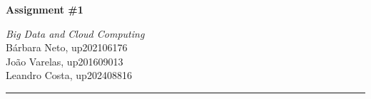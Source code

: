 \documentclass[a4paper,11pt]{article}
\renewenvironment{abstract}
 {\par\noindent\textbf{\abstractname}\ \ignorespaces \\}
 {\par\noindent\medskip}
\begin{document}
\pagestyle{fancy}
\thispagestyle{empty}
\renewcommand*{\thefootnote}{\fnsymbol{footnote}}
\begin{center}
\Large{\textbf{Assignment \#1}}
\normalsize

\textit{Big Data and Cloud Computing}
\vspace{0.3cm}
\\ Bárbara Neto, up202106176\\ João Varelas, up201609013 \\Leandro Costa, up202408816 \\
\vspace{1cm}
\medskip
\normalsize
\end{center}
%
{\color{gray}\hrule}
\medskip






%
\end{document}
